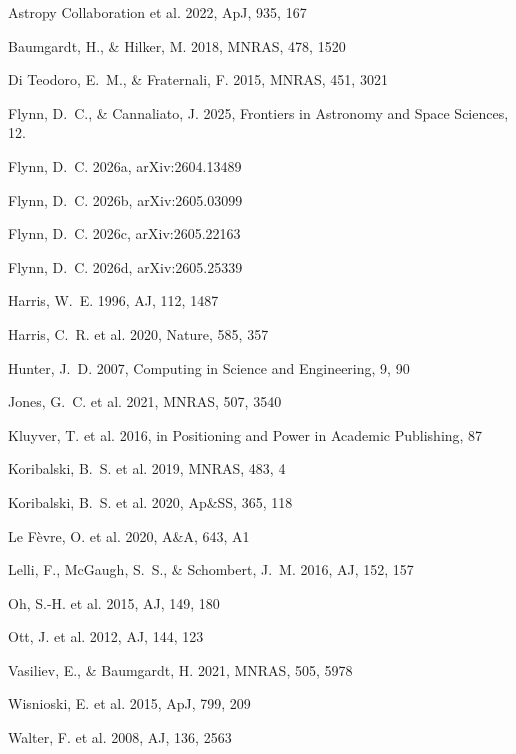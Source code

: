 \documentclass[twocolumn]{aastex631}
\begin{document}
\begin{thebibliography}{}

Astropy Collaboration et al. 2022, ApJ, 935, 167

Baumgardt, H., \& Hilker, M. 2018, MNRAS, 478, 1520

Di Teodoro, E.~M., \& Fraternali, F. 2015, MNRAS, 451, 3021

Flynn, D.~C., \& Cannaliato, J. 2025, Frontiers in Astronomy and Space
Sciences, 12. 

Flynn, D.~C. 2026a, arXiv:2604.13489

Flynn, D.~C. 2026b, arXiv:2605.03099

Flynn, D.~C. 2026c, arXiv:2605.22163

Flynn, D.~C. 2026d, arXiv:2605.25339

Harris, W.~E. 1996, AJ, 112, 1487

Harris, C.~R. et al. 2020, Nature, 585, 357

Hunter, J.~D. 2007, Computing in Science and Engineering, 9, 90

Jones, G.~C. et al. 2021, MNRAS, 507, 3540

Kluyver, T. et al. 2016, in Positioning and Power in Academic Publishing,
87

Koribalski, B.~S. et al. 2019, MNRAS, 483, 4

Koribalski, B.~S. et al. 2020, Ap\&SS, 365, 118

Le F\`evre, O. et al. 2020, A\&A, 643, A1

Lelli, F., McGaugh, S.~S., \& Schombert, J.~M. 2016, AJ, 152, 157

Oh, S.-H. et al. 2015, AJ, 149, 180

Ott, J. et al. 2012, AJ, 144, 123

Vasiliev, E., \& Baumgardt, H. 2021, MNRAS, 505, 5978

Wisnioski, E. et al. 2015, ApJ, 799, 209

Walter, F. et al. 2008, AJ, 136, 2563

\end{thebibliography}
\end{document}

